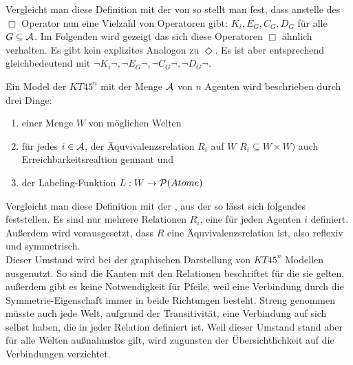 Vergleicht man diese Definition mit der von 
 so stellt man fest, dass anstelle des 
$\Box$ Operator nun eine Vielzahl von Operatoren gibt: 
$K_i, E_G, C_G, D_G$ für alle $ G \subseteq \mathcal{A}$.
Im Folgenden wird gezeigt das sich diese Operatoren $\Box$ ähnlich verhalten.
Es gibt kein explizites Analogon zu $\Diamond$.
Es ist aber entsprechend gleichbedeutend mit $\neg K_i \neg, \neg E_G \neg, \neg C_G \neg, \neg D_G \neg$.


\begin{definition}
	Ein Model \MMModelDef der \MML $KT45^n$ mit der Menge $\mathcal{A}$ von $n$ Agenten wird beschrieben durch drei Dinge:
	\begin{enumerate}
		\item einer Menge $W$ von möglichen Welten
		\item für jedes $i \in \mathcal{A}$, der Äquvivalenzsrelation $R_i$ auf $W$ $R_i \subseteq W \times W)$ auch Erreichbarkeitsrealtion gennant und
		\item der Labeling-Funktion $L: W \rightarrow \mathcal{P}(Atome)$
	\end{enumerate}
	\cite[S.336f]{huth2004logic}
\end{definition}

Vergleicht man diese Definition mit der , aus der \ML so lässt sich folgendes feststellen.
Es sind nur mehrere Relationen $R_i$, eine für jeden Agenten $i$ definiert.
Außerdem wird vorausgesetzt, dass $R$ eine Äquvivalenzsrelation ist, also reflexiv und symmetrisch.\\
Dieser Umstand wird bei der graphischen Darstellung von $KT45^n$ Modellen ausgenutzt.
So sind die Kanten mit den Relationen beschriftet für die sie gelten, außerdem gibt es keine Notwendigkeit für Pfeile, weil eine Verbindung durch die Symmetrie-Eigenschaft immer in beide Richtungen besteht.
Streng genommen müsste auch jede Welt, aufgrund der Transitivität, eine Verbindung auf sich selbst haben, die in jeder Relation definiert ist.
Weil dieser Umstand stand aber für alle Welten außnahmslos gilt, wird zugunsten der Übersichtlichkeit auf die Verbindungen verzichtet. 




